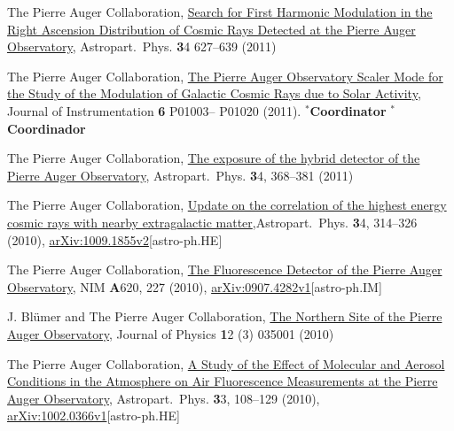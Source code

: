 \begin{etaremune}
\item {}The Pierre Auger Collaboration,
\href{http://dx.doi.org/10.1016/j.astropartphys.2010.12.007}{{Search for
First Harmonic Modulation in the Right Ascension Distribution of Cosmic Rays
Detected at the Pierre Auger Observatory}}, Astropart.\ Phys. {\textbf 34} 627--639
(2011)

\item {}The Pierre Auger Collaboration,
\href{http://dx.doi.org/10.1088/1748-0221/6/01/P01003}{{The Pierre Auger
Observatory Scaler Mode for the Study of the Modulation of Galactic Cosmic Rays
due to Solar Activity}}, Journal of Instrumentation {\textbf 6} P01003--
P01020 (2011). \ifeng $^*${\textbf{Coordinator}} \else $^*${\textbf{Coordinador}} \fi

\item {}The Pierre Auger Collaboration,
\href{http://dx.doi.org/10.1016/j.astropartphys.2010.10.001}{{The exposure
of the hybrid detector of the Pierre Auger Observatory}}, Astropart.\ Phys. {\textbf
34}, 368--381 (2011)

\item {}The Pierre Auger Collaboration,
\href{http://dx.doi.org/10.1016/j.astropartphys.2010.08.010}{{Update on
the correlation of the highest energy cosmic rays with nearby extragalactic
matter}},Astropart.\ Phys. {\textbf 34}, 314--326 (2010),
\href{http://arxiv.org/abs/1009.1855}{arXiv:1009.1855v2}[astro-ph.HE]

\item {}The Pierre Auger Collaboration,
\href{http://dx.doi.org/10.1016/j.nima.2010.04.023}{{The Fluorescence
Detector of the Pierre Auger Observatory}}, NIM {\textbf A620}, 227 (2010),
\href{http://arxiv.org/abs/0907.4282}{arXiv:0907.4282v1}[astro-ph.IM]

\item {}J. Blümer and The Pierre Auger Collaboration,
\href{http://dx.doi.org/10.1088/1367-2630/12/3/035001}{{The Northern Site
of the Pierre Auger Observatory}}, Journal of Physics {\textbf 12} (3) 035001
(2010)

\item {}The Pierre Auger Collaboration,
\href{http://dx.doi.org/10.1016/j.astropartphys.2009.12.005}{{A Study of
the Effect of Molecular and Aerosol Conditions in the Atmosphere on Air
Fluorescence Measurements at the Pierre Auger Observatory}}, Astropart.\ Phys.
{\textbf 33}, 108--129 (2010),
\href{http://arxiv.org/abs/0907.4282}{arXiv:1002.0366v1}[astro-ph.HE]


\end{etaremune}
